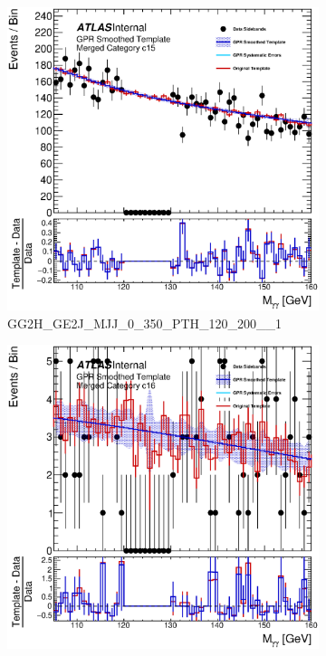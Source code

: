 \begin{figure}
\begin{center}
\begin{subfigure}[T]{0.49\linewidth}
	\includegraphics[width=\linewidth]{figures/background/gpr/coupCatTemplates/GPR_Smoothed_Plot_hmgg_c15.eps}
	\caption{\tiny{GG2H\_GE2J\_MJJ\_0\_350\_PTH\_120\_200\_\_1}}
\end{subfigure}
\begin{subfigure}[T]{0.49\linewidth}
	\centering
	\includegraphics[width=\linewidth]{figures/background/gpr/coupCatTemplates/GPR_Smoothed_Plot_hmgg_c16.eps}

\end{subfigure}
\end{center}
\end{figure}
